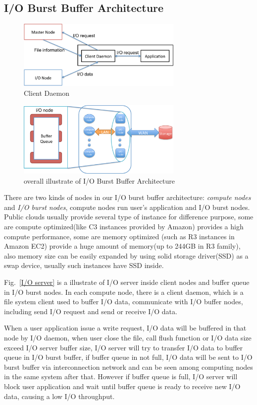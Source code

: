 \subsection{I/O Burst Buffer Architecture}

\begin{figure}[tb]
	\centering
	\includegraphics[width=8cm]{img/client_daemon}
	\caption{Client Daemon}
	\label{architecture:client_daemon}
\end{figure}

\begin{figure}[tb]
	\centering
	\includegraphics[width=8cm]{img/architecture_overview}
	\caption{overall illustrate of I/O Burst Buffer Architecture}
	\label{architecture:overview}
\end{figure}

There are two kinds of nodes in our I/O burst buffer architecture: \emph{compute nodes} and \emph{I/O burst nodes}, compute nodes run user's application and I/O burst nodes.
Public clouds usually provide several type of instance for difference purpose, some are compute optimized(like C3 instances provided by Amazon) provides a high compute performance,
some are memory optimized (such as R3 instances in Amazon EC2) provide a huge amount of memory(up to 244GB in R3 family), also memory size can be easily expanded by using solid storage driver(SSD) as a swap device, usually such instances have SSD inside.

Fig.~\ref{I/O server} is a illustrate of I/O server inside client nodes and buffer queue in I/O burst nodes.
In each compute node, there is a client daemon, which is a file system client used to buffer I/O data, communicate with I/O buffer nodes, including send I/O request and send or receive I/O data.

When a user application issue a write request, I/O data will be buffered in that node by I/O daemon, when user close the file, call flush function or I/O data size exceed I/O server buffer size, I/O server will try to transfer I/O data to buffer queue in I/O burst buffer, if buffer queue in not full, I/O data will be sent to I/O burst buffer via interconnection network and can be seen among computing nodes in the same system after that.
However if buffer queue is full, I/O server will block user application and wait until buffer queue is ready to receive new I/O data, causing a low I/O throughput.

